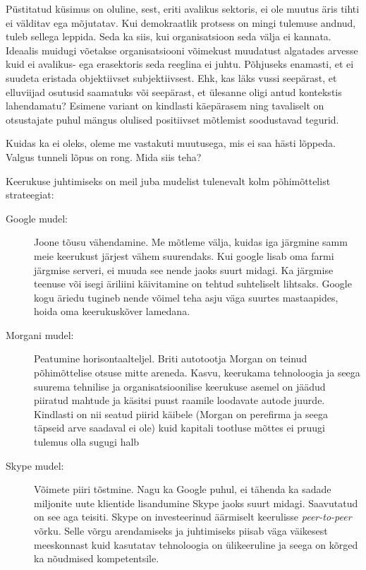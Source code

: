 \documentclass{tufte-book}
\begin{document}
Püstitatud küsimus on oluline, sest, eriti avalikus sektoris, ei ole muutus äris tihti ei välditav ega mõjutatav. Kui demokraatlik protsess on mingi tulemuse andnud, tuleb sellega leppida. Seda ka siis, kui organisatsioon seda välja ei kannata. Ideaalis muidugi võetakse organisatsiooni võimekust muudatust algatades arvesse kuid ei avalikus- ega erasektoris seda reeglina ei juhtu. Põhjuseks enamasti, et ei suudeta eristada objektiivset subjektiivsest. Ehk, kas läks vussi seepärast, et elluviijad osutusid saamatuks või seepärast, et ülesanne oligi antud kontekstis lahendamatu? Esimene variant on kindlasti käepärasem ning tavaliselt on otsustajate puhul mängus olulised positiivset mõtlemist soodustavad tegurid. 

Kuidas ka ei oleks, oleme me vastakuti muutusega, mis ei saa hästi lõppeda. Valgus tunneli lõpus on rong. Mida siis teha? 

Keerukuse juhtimiseks on meil juba mudelist tulenevalt kolm põhimõttelist strateegiat:
	\begin{description}
		\item[Google mudel:] Joone tõusu vähendamine. Me mõtleme välja, kuidas iga järgmine samm meie keerukust järjest vähem suurendaks. Kui google lisab oma farmi järgmise serveri, ei muuda see nende jaoks suurt midagi. Ka järgmise teenuse või isegi äriliini käivitamine on tehtud suhteliselt lihtsaks. Google kogu äriedu tugineb nende võimel teha asju väga suurtes mastaapides, hoida oma keerukuskõver lamedana.
		\item[Morgani mudel:] Peatumine horisontaalteljel. Briti autotootja Morgan on teinud põhimõttelise otsuse mitte areneda. Kasvu, keerukama tehnoloogia ja seega suurema tehnilise ja organisatsioonilise keerukuse asemel on jäädud piiratud mahtude ja käsitsi puust raamile loodavate autode juurde. Kindlasti on nii seatud piirid käibele (Morgan on perefirma ja seega täpseid arve saadaval ei ole) kuid kapitali tootluse mõttes ei pruugi tulemus olla sugugi halb
		\item[Skype mudel:] Võimete piiri tõstmine. Nagu ka Google puhul, ei tähenda ka sadade miljonite uute klientide lisandumine Skype jaoks suurt midagi. Saavutatud on see aga teisiti. Skype on investeerinud äärmiselt keerulisse \emph{peer-to-peer} võrku. Selle võrgu arendamiseks ja juhtimiseks piisab väga väikesest meeskonnast kuid kasutatav tehnoloogia on ülikeeruline ja seega on kõrged ka nõudmised kompetentsile.
	\end{description}
\end{document}
